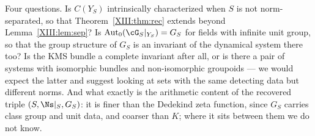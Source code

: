Four questions. Is $C(Y_S)$ intrinsically characterized when $S$ is not norm-separated, so
that Theorem~\ref{XIII:thm:rec} extends beyond Lemma~\ref{XIII:lem:sep}? Is
$\operatorname{Aut}_0(\cG_S|_{Y_S})=G_S$ for fields with infinite unit group, so that the group
structure of $G_S$ is an invariant of the dynamical system there too? Is the KMS bundle a
complete invariant after
all, or is there a pair of systems with isomorphic bundles and non-isomorphic groupoids ---
we would expect the latter and suggest looking at sets with the same detecting data but
different norms. And what exactly is the arithmetic content of the recovered triple
$(S,\Ns|_S,G_S)$: it is finer than the Dedekind zeta function, since $G_S$ carries class group
and unit data, and coarser than $K$; where it sits between them we do not know.


